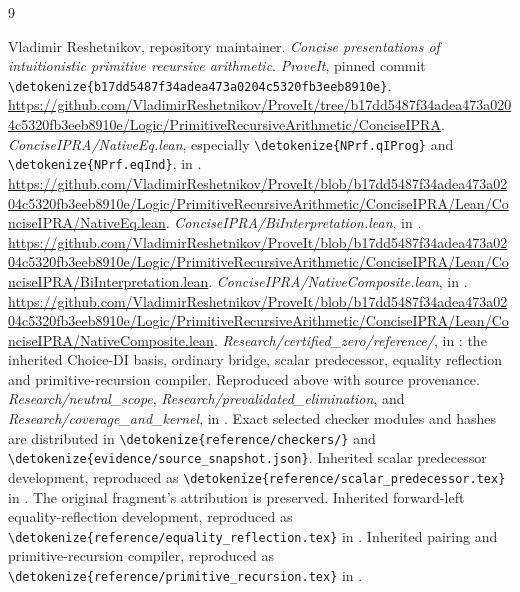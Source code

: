 \documentclass[11pt,letterpaper]{article}
\theoremstyle{definition}\newtheorem{definition}[theorem]{Definition}
\theoremstyle{remark}\newtheorem{remark}[theorem]{Remark}
\newcommand{\file}[1]{\expandafter\nolinkurl\expandafter{\detokenize{#1}}}
\begin{document}
\clearpage
\begin{thebibliography}{9}
\raggedright
{}
Vladimir Reshetnikov, repository maintainer.
\emph{Concise presentations of intuitionistic primitive recursive arithmetic}.
\emph{ProveIt}, pinned commit
\file{b17dd5487f34adea473a0204c5320fb3eeb8910e}.
\url{https://github.com/VladimirReshetnikov/ProveIt/tree/b17dd5487f34adea473a0204c5320fb3eeb8910e/Logic/PrimitiveRecursiveArithmetic/ConciseIPRA}.
\emph{ConciseIPRA/NativeEq.lean}, especially
\file{NPrf.qIProg} and \file{NPrf.eqInd}, in \cite{repo}.
\url{https://github.com/VladimirReshetnikov/ProveIt/blob/b17dd5487f34adea473a0204c5320fb3eeb8910e/Logic/PrimitiveRecursiveArithmetic/ConciseIPRA/Lean/ConciseIPRA/NativeEq.lean}.
\emph{ConciseIPRA/BiInterpretation.lean}, in \cite{repo}.
\url{https://github.com/VladimirReshetnikov/ProveIt/blob/b17dd5487f34adea473a0204c5320fb3eeb8910e/Logic/PrimitiveRecursiveArithmetic/ConciseIPRA/Lean/ConciseIPRA/BiInterpretation.lean}.
\emph{ConciseIPRA/NativeComposite.lean}, in \cite{repo}.
\url{https://github.com/VladimirReshetnikov/ProveIt/blob/b17dd5487f34adea473a0204c5320fb3eeb8910e/Logic/PrimitiveRecursiveArithmetic/ConciseIPRA/Lean/ConciseIPRA/NativeComposite.lean}.
\emph{Research/certified\_zero/reference/}, in \cite{repo}:
the inherited Choice-DI basis, ordinary bridge, scalar predecessor,
equality reflection and primitive-recursion compiler. Reproduced above
with source provenance.
\emph{Research/neutral\_scope},
\emph{Research/prevalidated\_elimination}, and
\emph{Research/coverage\_and\_kernel}, in \cite{repo}.
Exact selected checker modules and hashes are distributed in
\file{reference/checkers/} and \file{evidence/source_snapshot.json}.
Inherited scalar predecessor development, reproduced as
\file{reference/scalar_predecessor.tex} in \cite{inherited}.
The original fragment's attribution is preserved.
Inherited forward-left equality-reflection development, reproduced as
\file{reference/equality_reflection.tex} in \cite{inherited}.
Inherited pairing and primitive-recursion compiler, reproduced as
\file{reference/primitive_recursion.tex} in \cite{inherited}.
\end{thebibliography}
\end{document}
